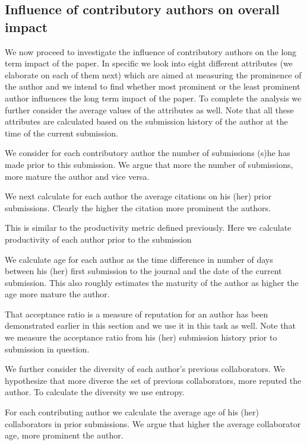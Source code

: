 \subsection*{Influence of contributory authors on overall impact}

We now proceed to investigate the influence of contributory authors on the long term impact of the paper. In specific we look into eight different attributes (we elaborate on each of them next) which are aimed at measuring the prominence of the author and we intend to find whether most prominent or the least prominent author influences the long term impact of the paper. To complete the analysis we further consider the average values of the attributes as well. Note that all these attributes are calculated based on the submission history of the author at the time of the current submission. 

We consider for each contributory author the number of submissions (s)he has made prior to this submission. We argue that more the number of submissions, more mature the author and vice versa. 

We next calculate for each author the average citations on his (her) prior submissions. Clearly the higher the citation more prominent the authors.

This is similar to the productivity metric defined previously. Here we calculate productivity of each author prior to the submission  

 We calculate age for each author as the time difference in number of days between his (her) first submission to the journal and the date of the current submission. This also roughly estimates the maturity of the author as higher the age more mature the author.

That acceptance ratio is a measure of reputation for an author has been demonstrated earlier in this section and we use it in this task as well. Note that we measure the acceptance ratio from his (her) submission history prior to submission in question. 

We further consider the diversity of each author's previous collaborators. We hypothesize that more diverse the set of previous collaborators, more reputed the author. To calculate the diversity we use entropy.

For each contributing author we calculate the average age of his (her) collaborators in prior submissions. We argue that higher the average collaborator age, more prominent the author. 

